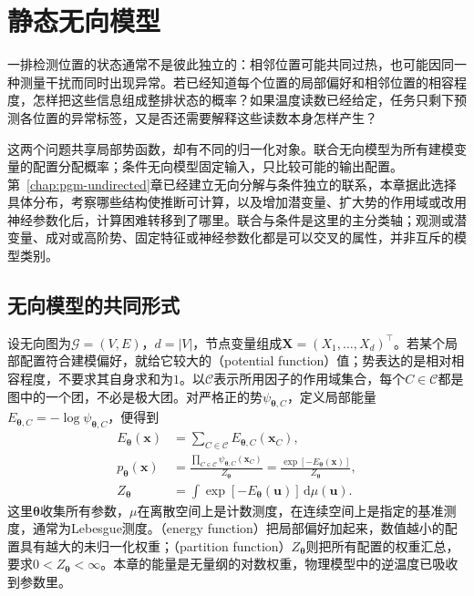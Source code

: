 \chapter{静态无向模型}
\label{chap:pgm-energy-models}

一排检测位置的状态通常不是彼此独立的：相邻位置可能共同过热，也可能因同一种测量干扰而同时出现异常。若已经知道每个位置的局部偏好和相邻位置的相容程度，怎样把这些信息组成整排状态的概率？如果温度读数已经给定，任务只剩下预测各位置的异常标签，又是否还需要解释这些读数本身怎样产生？

这两个问题共享局部势函数，却有不同的归一化对象。联合无向模型为所有建模变量的配置分配概率；条件无向模型固定输入，只比较可能的输出配置。第~\ref{chap:pgm-undirected}章已经建立无向分解与条件独立的联系，本章据此选择具体分布，考察哪些结构使推断可计算，以及增加潜变量、扩大势的作用域或改用神经参数化后，计算困难转移到了哪里。联合与条件是这里的主分类轴；观测或潜变量、成对或高阶势、固定特征或神经参数化都是可以交叉的属性，并非互斥的模型类别。

\section{无向模型的共同形式}
\label{sec:pgm-energy-models-common}

设无向图为$\mathcal{G}=(V,E)$，$d=|V|$，节点变量组成$\bm{X}=(X_1,\ldots,X_d)^\top$。若某个局部配置符合建模偏好，就给它较大的（potential function）值；势表达的是相对相容程度，不要求其自身求和为$1$。以$\mathcal{C}$表示所用因子的作用域集合，每个$C\in\mathcal{C}$都是图中的一个团，不必是极大团。对严格正的势$\psi_{\bm{\theta},C}$，定义局部能量$E_{\bm{\theta},C}=-\log\psi_{\bm{\theta},C}$，便得到
\begin{equation}
  \begin{aligned}
    E_{\bm{\theta}}(\bm{x})
      &=\sum_{C\in\mathcal{C}}E_{\bm{\theta},C}(\bm{x}_C),\\
    p_{\bm{\theta}}(\bm{x})
      &=\frac{\prod_{C\in\mathcal{C}}
               \psi_{\bm{\theta},C}(\bm{x}_C)}
              {Z_{\bm{\theta}}}
        =\frac{\exp[-E_{\bm{\theta}}(\bm{x})]}{Z_{\bm{\theta}}},\\
    Z_{\bm{\theta}}
      &=\int \exp[-E_{\bm{\theta}}(\bm{u})]\,\mathrm{d}\mu(\bm{u}).
  \end{aligned}
  \label{eq:pgm-energy-models-joint}
\end{equation}
这里$\bm{\theta}$收集所有参数，$\mu$在离散空间上是计数测度，在连续空间上是指定的基准测度，通常为Lebesgue测度。（energy function）把局部偏好加起来，数值越小的配置具有越大的未归一化权重；（partition function）$Z_{\bm{\theta}}$则把所有配置的权重汇总，要求$0<Z_{\bm{\theta}}<\infty$。本章的能量是无量纲的对数权重，物理模型中的逆温度已吸收到参数里。

